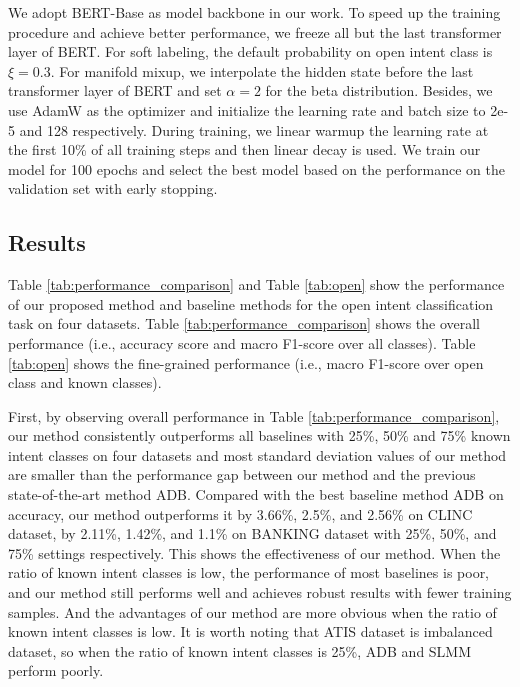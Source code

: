 \documentclass[journal]{IEEEtran}
\begin{document}
We adopt BERT-Base \cite{Devlin19} as model backbone in our work.
To speed up the training procedure and achieve better performance, we freeze all but the last transformer layer of BERT.
For soft labeling, the default probability on open intent class is $\xi = 0.3$.
For manifold mixup, we interpolate the hidden state before the last transformer layer of BERT and set $\alpha = 2$ for the beta distribution.
Besides, we use AdamW \cite{DBLP:conf/iclr/LoshchilovH19} as the optimizer and initialize the learning rate and batch size to 2e-5 and 128 respectively.
During training, we linear warmup the learning rate at the first 10\% of all training steps and then linear decay is used.
We train our model for 100 epochs and select the best model based on the performance on the validation set with early stopping.


\subsection{Results}

Table \ref{tab:performance_comparison} and Table \ref{tab:open} show the performance of our proposed method and baseline methods for the open intent classification task on four datasets.
Table \ref{tab:performance_comparison} shows the overall performance (i.e., accuracy score and macro F1-score over all classes).
Table \ref{tab:open} shows the fine-grained performance (i.e., macro F1-score over open class and known classes).

First, by observing overall performance in Table \ref{tab:performance_comparison}, our method consistently outperforms all baselines with 25\%, 50\% and 75\% known intent classes on four datasets and most standard deviation values of our method are smaller than the performance gap between our method and the previous state-of-the-art method ADB.
Compared with the best baseline method ADB on accuracy, our method outperforms it by 3.66\%, 2.5\%, and 2.56\% on CLINC dataset, by 2.11\%, 1.42\%, and 1.1\% on BANKING dataset with 25\%, 50\%, and 75\% settings respectively.
This shows the effectiveness of our method.
When the ratio of known intent classes is low, the performance of most baselines is poor, and our method still performs well and achieves robust results with fewer training samples.
And the advantages of our method are more obvious when the ratio of known intent classes is low.
It is worth noting that ATIS dataset is imbalanced dataset, so when the ratio of known intent classes is 25\%, ADB and SLMM perform poorly. 
\end{document}
